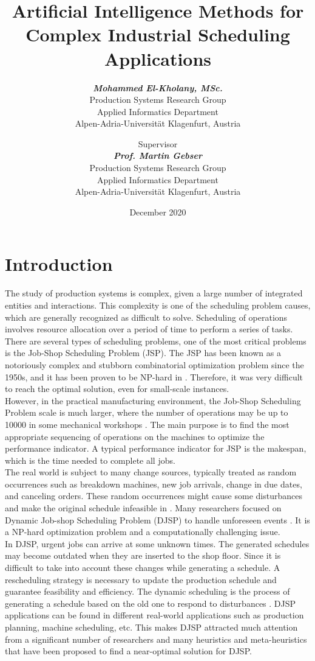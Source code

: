 \documentclass{article}
\title{\textbf{Artificial Intelligence Methods for Complex Industrial Scheduling Applications} \\}
\author{\textit{\textbf{Mohammed El-Kholany, MSc.}}\\ Production Systems Research Group\\Applied Informatics Department\\Alpen-Adria-Universität Klagenfurt, Austria \\[1in] \and Supervisor\\ \textit{\textbf{Prof. Martin Gebser}} \\ Production Systems Research Group\\Applied Informatics Department\\Alpen-Adria-Universität Klagenfurt, Austria \\[1in]}
\date{December 2020}
\begin{document}
\maketitle

\section{Introduction}
The study of production systems is complex, given a large number of integrated entities and interactions. This complexity is one of the scheduling problem causes, which are generally recognized as difficult to solve\cite{garey1979computers,lenstra1977complexity}. Scheduling of operations involves resource allocation over a period of time to perform a series of tasks. There are several types of scheduling problems, one of the most critical problems is the Job-Shop Scheduling Problem (JSP). The JSP has been known as a notoriously complex and stubborn combinatorial optimization problem since the 1950s, and it has been proven to be NP-hard in \cite{baker1974introduction,lenstra1979computational}. Therefore, it was very difficult to reach the optimal solution, even for small-scale instances.\\

However, in the practical manufacturing environment, the Job-Shop Scheduling Problem scale is much larger, where the number of operations may be up to 10000 in some mechanical workshops \cite{zhang2010hybrid}. The main purpose is to find the most appropriate sequencing of operations on the machines to optimize the performance indicator. A typical performance indicator for JSP is the makespan, which is the time needed to complete all jobs. \\

The real world is subject to many change sources, typically treated as random occurrences such as breakdown machines, new job arrivals, change in due dates, and canceling orders. These random occurrences might cause some disturbances and make the original schedule infeasible in \cite{salido2017rescheduling}. Many researchers focused on Dynamic Job-shop Scheduling Problem (DJSP) to handle unforeseen events \cite{zhang2017flexible,xiong2013robust, salido2017rescheduling}. It is a NP-hard optimization problem and a computationally challenging issue. \\

In DJSP, urgent jobs can arrive at some unknown times. The generated schedules may become outdated when they are inserted to the shop floor. Since it is difficult to take into account these changes while generating a schedule. A rescheduling strategy is necessary to update the production schedule and guarantee feasibility and efficiency. The dynamic scheduling is the process of generating a schedule based on the old one to respond to disturbances \cite{sajadi2019robust}. DJSP applications can be found in different real-world applications such as production planning, machine scheduling, etc. This makes DJSP attracted much attention from a significant number of researchers and many heuristics and meta-heuristics that have been proposed to find a near-optimal solution for DJSP. 
\end{document}
